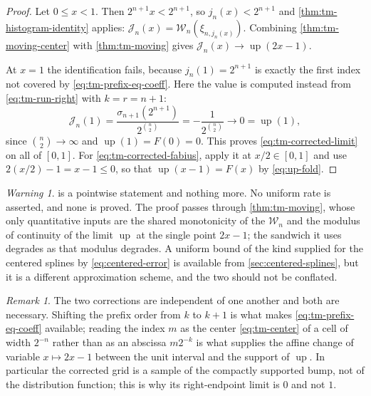 \documentclass[11pt,oneside]{article}
\theoremstyle{definition}
\theoremstyle{remark}
\newtheorem{remark}[theorem]{Remark}
\newtheorem{warning}[theorem]{Warning}
\newcommand{\Up}{\operatorname{up}}
\begin{document}
\begin{proof}
Let $0\le x<1$.  Then $2^{n+1}x<2^{n+1}$, so $j_n(x)<2^{n+1}$ and
\cref{thm:tm-histogram-identity} applies:
$\mathcal J_n(x)=\mathcal W_n(\xi_{n,j_n(x)})$.  Combining
\cref{thm:tm-moving-center} with \cref{thm:tm-moving} gives
$\mathcal J_n(x)\to\Up(2x-1)$.

At $x=1$ the identification fails, because $j_n(1)=2^{n+1}$ is exactly the first index not
covered by \eqref{eq:tm-prefix-eq-coeff}.  Here the value is computed instead from
\eqref{eq:tm-run-right} with $k=r=n+1$:
\begin{equation*}
 \mathcal J_n(1)=\frac{\sigma_{n+1}(2^{n+1})}{2^{\binom n2}}=-\frac1{2^{\binom n2}}
 \longrightarrow0=\Up(1),
\end{equation*}
since $\binom n2\to\infty$ and $\Up(1)=F(0)=0$.  This proves
\eqref{eq:tm-corrected-limit} on all of $[0,1]$.  For \eqref{eq:tm-corrected-fabius}, apply
it at $x/2\in[0,1]$ and use $2(x/2)-1=x-1\le0$, so that $\Up(x-1)=F(x)$ by
\eqref{eq:up-fold}.
\end{proof}

\begin{warning}
 is a pointwise statement and nothing more.  No uniform
rate is asserted, and none is proved.  The proof passes through
\cref{thm:tm-moving}, whose only quantitative inputs are the shared monotonicity of the
$\mathcal W_n$ and the modulus of continuity of the limit $\Up$ at the single point $2x-1$; the
sandwich it uses degrades as that modulus degrades.  A uniform bound of the kind supplied
for the centered splines by \eqref{eq:centered-error} is available from
\cref{sec:centered-splines}, but it is a different approximation scheme, and the two should
not be conflated.
\end{warning}

\begin{remark}
The two corrections are independent of one another and both are necessary.  Shifting the
prefix order from $k$ to $k+1$ is what makes \eqref{eq:tm-prefix-eq-coeff} available;
reading the index $m$ as the center \eqref{eq:tm-center} of a cell of width $2^{-n}$ rather
than as an abscissa $m2^{-k}$ is what supplies the affine change of variable $x\mapsto2x-1$
between the unit interval and the support of $\Up$.  In particular the corrected grid is a
sample of the compactly supported bump, not of the distribution function; this is why its
right-endpoint limit is $0$ and not $1$.
\end{remark}
\end{document}
